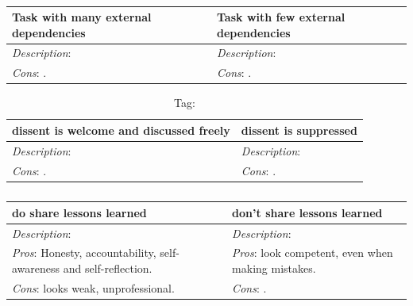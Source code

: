 \begin{center}
\begin{table}[ht]
\begin{tabular}{ | m{\dilemmatablewidth}| m{\dilemmatablewidth} | } 
  \hline
  \textbf{Task with many external dependencies} & 
  \textbf{Task with few external dependencies} \\ 
  \hline
  \textit{Description}:  & 
  \textit{Description}:  \\ 
  \hline
  \textit{Cons}: . & 
  \textit{Cons}: . \\  
  \hline
\end{tabular}
\caption{
}
\label{table:number_of_external dependencies}
\end{table}
\end{center}


\begin{center}
\begin{table}[ht]
\begin{tabular}{ | m{\dilemmatablewidth}| m{\dilemmatablewidth} | } 
  \hline
  \textbf{dissent is welcome and discussed freely} & 
  \textbf{dissent is suppressed} \\ 
  \hline
  \textit{Description}:  & 
  \textit{Description}:  \\ 
  \hline
  \textit{Cons}: . & 
  \textit{Cons}: . \\  
  \hline
\end{tabular}
\caption{
{\tiny Tag: }
}
\label{table:how_dissent_is_responded_to}
\end{table}
\end{center}


\begin{center}
\begin{table}[ht]
\begin{tabular}{ | m{\dilemmatablewidth}| m{\dilemmatablewidth} | } 
  \hline
  \textbf{do share lessons learned} & 
  \textbf{don't share lessons learned} \\ 
  \hline
  \textit{Description}:  & 
  \textit{Description}:  \\ 
  \hline
  \textit{Pros}: Honesty, accountability, self-awareness and self-reflection. & 
  \textit{Pros}: look competent, even when making mistakes. \\  
  \hline
  \textit{Cons}: looks weak, unprofessional. & 
  \textit{Cons}: . \\  
  \hline
\end{tabular}
\caption{
}
\label{table:sharing_lessons_learned}
\end{table}
\end{center}

